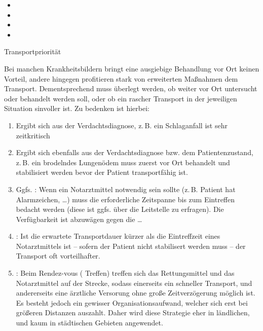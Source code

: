 \begin{itemize}
  \item {}
  \item {}
  \item {}
  \item {}
\end{itemize}


\TextSlide
{Transportpriorität}
{%
%
\label{topic:transportprioritaet-apam}%
Bei manchen Krankheitsbildern bringt eine ausgiebige
Behandlung vor Ort keinen Vorteil, andere hingegen
profitieren stark von erweiterten Maßnahmen  dem
Transport. Dementsprechend muss überlegt werden, ob weiter
vor Ort untersucht oder behandelt werden soll, oder ob ein
rascher Transport in der jeweiligen Situation sinvoller ist.
Zu bedenken ist hierbei:

\begin{enumerate}
  \item {} Ergibt sich aus der
  Verdachtsdiagnose, z.\,B. ein Schlaganfall ist sehr
  zeitkritisch
  \item {} Ergibt sich ebenfalls
  aus der Verdachtsdiagnose bzw. dem Patientenzustand, z.\,B.
  ein brodelndes Lungenödem muss zuerst vor Ort behandelt und stabilisiert werden
  bevor der Patient transportfähig ist.
  \item Ggfs. : Wenn
  ein Notarztmittel notwendig sein sollte (z.\,B. Patient hat
  Alarmzeichen, \ldots) muss die erforderliche Zeitspanne
  bis zum Eintreffen bedacht werden (diese ist ggfs. über
  die Leitstelle zu erfragen). Die Verfügbarkeit ist
  abzuwägen gegen die \ldots
  \item {}: Ist die
  erwartete Transportdauer kürzer als die Eintreffzeit eines
  Notarztmittels ist -- sofern der Patient nicht stabilisert
  werden muss -- der Transport oft vorteilhafter. 
  \item {}: Beim Rendez-vous (
  Treffen) treffen sich das Rettungsmittel und das
  Notarztmittel auf der Strecke, sodass einerseits ein
  schneller Transport, und andererseits eine ärztliche
  Versorung ohne große Zeitverzögerung möglich ist. Es
  besteht jedoch ein gewisser Organisationsaufwand, welcher
  sich erst bei größeren Distanzen auszahlt. Daher wird
  diese Strategie eher in ländlichen, und kaum in
  städtischen Gebieten angewendet.
\end{enumerate}

}
